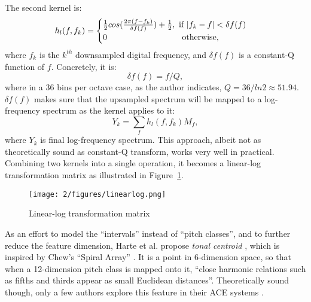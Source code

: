 The second kernel is:
\begin{equation}
h_l(f,f_k) = 
\begin{cases}
{1\over 2} cos ({2\pi (f-f_k) \over {\delta f(f)}}) + {1\over 2}, \text{ if } |f_k-f|<\delta f(f)\\
0 \quad\quad\quad\quad\quad\quad\quad\quad\quad\text{otherwise,}
\end{cases}
\end{equation}
where $f_k$ is the $k^{th}$ downsampled digital frequency, and $\delta f(f)$ is a constant-Q function of $f$. Concretely, it is:
\begin{equation}
\delta f(f) = f/Q,
\end{equation}
where in a 36 bins per octave case, as the author indicates, $Q=36/ln2 \approx 51.94$. $\delta f(f)$ makes sure that the upsampled spectrum will be mapped to a log-frequency spectrum as the kernel applies to it:
\begin{equation}
Y_k = \sum_f h_l(f,f_k)M_f,
\end{equation}
where $Y_k$ is final log-frequency spectrum. This approach, albeit not as theoretically sound as constant-Q transform, works very well in practical. Combining two kernels into a single operation, it becomes a linear-log transformation matrix as illustrated in Figure~\ref{fig:2-linearlog}.
\begin{figure}[htb]
\centering
\texttt{[image: 2/figures/linearlog.png]}
\caption{Linear-log transformation matrix}
\label{fig:2-linearlog}
\end{figure}

As an effort to model the ``intervals'' instead of ``pitch classes'', and to further reduce the feature dimension, Harte et al. propose {\it tonal centroid} \cite{harte2006detecting}, which is inspired by Chew's ``Spiral Array'' \cite{chew2000towards}. It is a point in 6-dimension space, so that when a 12-dimension pitch class is mapped onto it, ``close harmonic relations such as fifths and thirds appear as small Euclidean distances''. Theoretically sound though, only a few authors explore this feature in their ACE systems \cite{lee2008acoustic,humphrey2012learning}.
 

